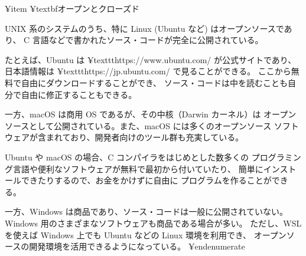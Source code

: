 ¥item ¥textbf{オープンとクローズド}

UNIX 系のシステムのうち、特に Linux (Ubuntu など) はオープンソースであり、
C 言語などで書かれたソース・コードが完全に公開されている。

たとえば、Ubuntu は ¥texttt{https://www.ubuntu.com/} が公式サイトであり、
日本語情報は ¥texttt{https://jp.ubuntu.com/} で見ることができる。
ここから無料で自由にダウンロードすることができ、
ソース・コードは中を読むことも自分で自由に修正することもできる。

一方、macOS は商用 OS であるが、その中核（Darwin カーネル）は
オープンソースとして公開されている。また、macOS には多くのオープンソース
ソフトウェアが含まれており、開発者向けのツール群も充実している。

Ubuntu や macOS の場合、C コンパイラをはじめとした数多くの
プログラミング言語や便利なソフトウェアが無料で最初から付いていたり、
簡単にインストールできたりするので、お金をかけずに自由に
プログラムを作ることができる。

一方、Windows は商品であり、ソース・コードは一般に公開されていない。
Windows 用のさまざまなソフトウェアも商品である場合が多い。
ただし、WSL を使えば Windows 上でも Ubuntu などの Linux 環境を利用でき、
オープンソースの開発環境を活用できるようになっている。
¥end{enumerate}
